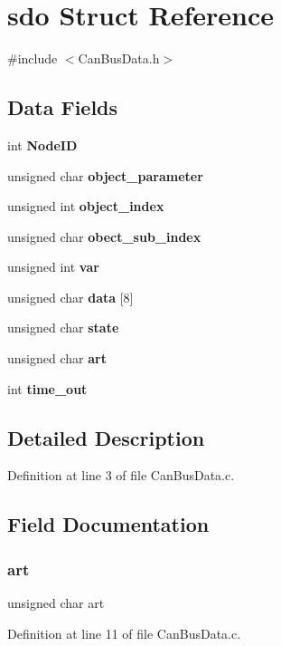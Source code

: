 \section{sdo Struct Reference}
\label{structsdo}


{\ttfamily \#include $<$Can\+Bus\+Data.\+h$>$}

\subsection*{Data Fields}
\begin{DoxyCompactItemize}
\item 
int \textbf{ Node\+ID}
\item 
unsigned char \textbf{ object\+\_\+parameter}
\item 
unsigned int \textbf{ object\+\_\+index}
\item 
unsigned char \textbf{ obect\+\_\+sub\+\_\+index}
\item 
unsigned int \textbf{ var}
\item 
unsigned char \textbf{ data} [8]
\item 
unsigned char \textbf{ state}
\item 
unsigned char \textbf{ art}
\item 
int \textbf{ time\+\_\+out}
\end{DoxyCompactItemize}


\subsection{Detailed Description}


Definition at line 3 of file Can\+Bus\+Data.\+c.



\subsection{Field Documentation}
\mbox{\label{structsdo_a776cb6b3c8d1fd8f726d1c34db851bd0}} 
\subsubsection{art}
{\footnotesize\ttfamily unsigned char art}



Definition at line 11 of file Can\+Bus\+Data.\+c.

\mbox{\label{structsdo_a225e60b2181be22b559b126469e2da69}} 
